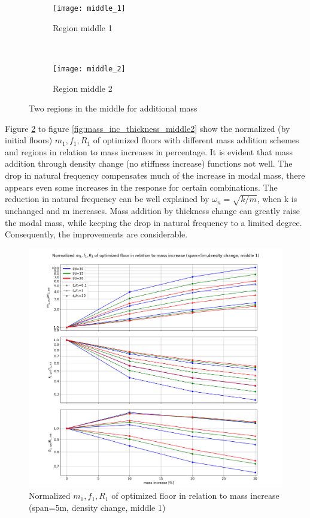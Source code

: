 \begin{figure}[H]
\begin{subfigure}[b]{.49\textwidth}
  \centering
  \texttt{[image: middle\_1]}
  \caption{Region middle 1}
\end{subfigure}
~
\begin{subfigure}[b]{.49\textwidth}
  \centering
  \texttt{[image: middle\_2]}
  \caption{Region middle 2}
\end{subfigure}

\caption{Two regions in the middle for additional mass}
\label{fig:middle_1_2}
\end{figure}

Figure \ref{fig:mass_inc_density_middle1} to figure \ref{fig:mass_inc_thickness_middle2} show the normalized (by initial floors) $m_1,f_1,R_1$ of optimized floors with different mass addition schemes and regions in relation to mass increases in percentage. It is evident that mass addition through density change (no stiffness increase) functions not well. The drop in natural frequency compensates much of the increase in modal mass, there appears even some increases in the response for certain combinations. The reduction in natural frequency can be well explained by $\omega_n=\sqrt{k/m}$, when k is unchanged and m increases. Mass addition by thickness change can greatly raise the modal mass, while keeping the drop in natural frequency to a limited degree. Consequently, the improvements are considerable. 
\begin{figure}[H]
\centering
\includegraphics[width=.99\textwidth]{images/mass_inc_density_middle1.png}
\caption{Normalized $m_1,f_1,R_1$ of optimized floor in relation to mass increase (span=5m, density change, middle 1)}
\label{fig:mass_inc_density_middle1}
\end{figure}

